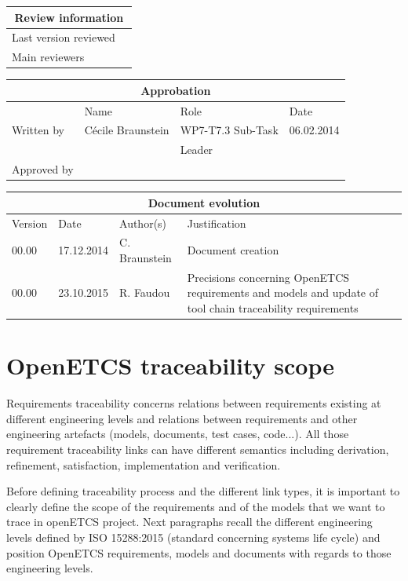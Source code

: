 \documentclass[11pt]{template/openetcs_report}
\begin{document}
\begin{tabular}{|p{4.4cm}|p{8.7cm}|}
\hline
\multicolumn{2}{|c|}{Review information} \\
\hline
Last version reviewed &  \\
\hline
Main reviewers &  \\
\hline
\end{tabular}

\begin{tabular}{|p{2.2cm}|p{4cm}|p{4cm}|p{2cm}|}
\hline
\multicolumn{4}{|c|}{Approbation} \\
\hline
  &  Name & Role & Date   \\
\hline  
Written by    &  Cécile Braunstein & WP7-T7.3 Sub-Task  & 06.02.2014 \\
&  & Leader&\\
\hline
Approved by &  &   &  \\
\hline
\end{tabular}

\begin{tabular}{|p{2.2cm}|p{2cm}|p{3cm}|p{5cm}|}
\hline
\multicolumn{4}{|c|}{Document evolution} \\
\hline
Version &  Date & Author(s) & Justification  \\
\hline  
00.00 & 17.12.2014 & C. Braunstein  &  Document creation  \\
\hline  
00.00 & 23.10.2015 & R. Faudou  &  Precisions concerning OpenETCS requirements and models and update of tool chain traceability requirements  \\


\hline  
\end{tabular}
\newpage
\mainmatter
\chapter{OpenETCS traceability scope}

Requirements traceability concerns relations between requirements existing at different engineering levels and relations between requirements and other engineering artefacts (models, documents, test cases, code...). All those requirement traceability links can have different semantics including derivation, refinement,  satisfaction, implementation and verification. 

Before defining traceability process and the different link types, it is important to clearly define the scope of the requirements and of the models that we want to trace in openETCS project.
Next paragraphs recall the different engineering levels defined by ISO 15288:2015 (standard concerning systems life cycle) and position OpenETCS requirements, models and documents with regards to those engineering levels.
\end{document}
